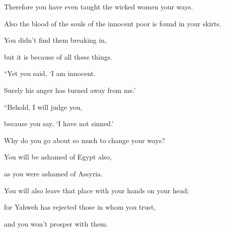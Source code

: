 {\par }{\QB Therefore you have even taught the wicked women your ways.
\par }{\Q {}Also the blood of the souls of the innocent poor is found in your skirts.
\par }{\QB You didn’t find them breaking in,
\par }{\QB but it is because of all these things.
\par }{\Q {}“Yet you said, ‘I am innocent.
\par }{\QB Surely his anger has turned away from me.’
\par }{\Q “Behold, I will judge you,
\par }{\QB because you say, ‘I have not sinned.’
\par }{\Q {}Why do you go about so much to change your ways?
\par }{\QB You will be ashamed of Egypt also,
\par }{\QB as you were ashamed of Assyria.
\par }{\Q {}You will also leave that place with your hands on your head;
\par }{\QB for Yahweh has rejected those in whom you trust,
\par }{\QB and you won’t prosper with them.

}
